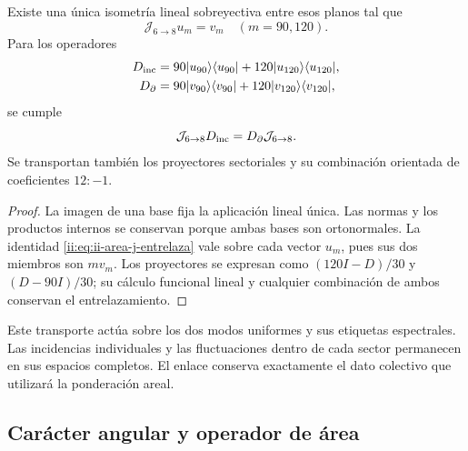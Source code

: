 \begin{theorem}
\label{ii:thm:ii-area-entrelazamiento-colectivo}
Existe una única isometría lineal sobreyectiva entre esos planos tal que
\begin{equation}
 \mathcal J_{6\to8}u_m=v_m\quad(m=90,120).
 \label{ii:eq:ii-area-j-colectivo}
\end{equation}
Para los operadores
\[
 \begin{aligned}
 D_{\rm inc}&=90|u_{90}\rangle\langle u_{90}|
             +120|u_{120}\rangle\langle u_{120}|,\\
 D_\partial&=90|v_{90}\rangle\langle v_{90}|
             +120|v_{120}\rangle\langle v_{120}|,
 \end{aligned}
\]
se cumple
\begin{equation}
 \mathcal J_{6\to8}D_{\rm inc}
 =D_\partial\mathcal J_{6\to8}.
 \label{ii:eq:ii-area-j-entrelaza}
\end{equation}
Se transportan también los proyectores sectoriales y su combinación
orientada de coeficientes \(12:-1\).
\end{theorem}
\begin{proof}
La imagen de una base fija la aplicación lineal única. Las normas y los
productos internos se conservan porque ambas bases son ortonormales.
La identidad \eqref{ii:eq:ii-area-j-entrelaza} vale sobre cada vector
\(u_m\), pues sus dos miembros son \(m v_m\). Los proyectores se
expresan como \((120I-D)/30\) y \((D-90I)/30\); su cálculo funcional
lineal y cualquier combinación de ambos conservan el entrelazamiento.
\end{proof}

Este transporte actúa sobre los dos modos uniformes y sus etiquetas
espectrales. Las incidencias individuales y las fluctuaciones dentro de
cada sector permanecen en sus espacios completos. El enlace conserva
exactamente el dato colectivo que utilizará la ponderación areal.

\subsection{Carácter angular y operador de área}
\label{ii:sec:ii-area-caracter}

